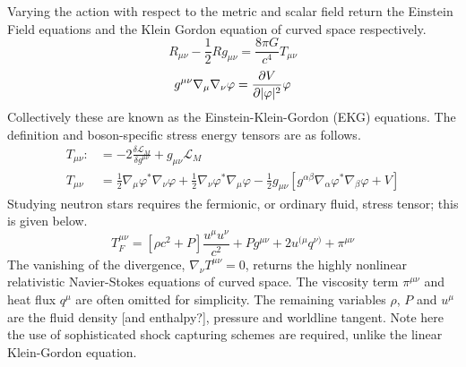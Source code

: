 Varying the action with respect to the metric and scalar field return the Einstein Field equations and the Klein Gordon equation of curved space respectively.
\begin{equation} R_{\mu\nu} - \frac{1}{2}R g_{\mu\nu} =  \frac{8\pi G}{c^4} T_{\mu\nu}  \end{equation}
\begin{equation}  g^{\mu\nu}\nabla_\mu\nabla_\nu \varphi = \frac{\partial V}{\partial |\varphi|^2}\varphi \end{equation}
Collectively these are known as the Einstein-Klein-Gordon (EKG) equations. The definition and boson-specific stress energy tensors are as follows.
\begin{align}  
T_{\mu\nu} :&= -2\frac{\delta \mathcal{L}_{M}}{\delta g^{\mu\nu}}+g_{\mu\nu}\mathcal{L}_M \\
T_{\mu\nu} &= \frac{1}{2}\nabla_{\mu}\varphi^*\nabla_{\nu}\varphi+\frac{1}{2}\nabla_{\nu}\varphi^*\nabla_{\mu}\varphi-\frac{1}{2}g_{\mu\nu}\left[g^{\alpha\beta}\nabla_\alpha\varphi^*\nabla_\beta\varphi + V\right] 
\end{align}
Studying neutron stars requires the fermionic, or ordinary fluid, stress tensor; this is given below.
\begin{equation} T^{\mu\nu}_F = \left[\rho c^2+ {P} \right]\frac{u^\mu u^\nu}{c^2} + P g^{\mu\nu} + 2u^{(\mu}q^{\nu)}+\pi^{\mu\nu}\end{equation} 
The vanishing of the divergence, $\nabla_\nu T^{\mu\nu}=0 $, returns the highly nonlinear relativistic Navier-Stokes equations of curved space. The viscosity term $\pi^{\mu\nu}$ and heat flux $q^\mu$ are often omitted for simplicity. The remaining variables $\rho$, $P$ and $u^\mu$ are the fluid density [and enthalpy?], pressure and worldline tangent. Note here the use of sophisticated shock capturing schemes are required, unlike the linear Klein-Gordon equation.


